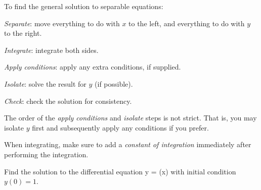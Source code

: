 \documentclass{book}
\begin{document}
To find the general solution to separable equations:
\begin{enumerate*}
\item \emph{Separate}: move everything to do with $x$ to the left, and
  everything to do with $y$ to the right.
\item \emph{Integrate}: integrate both sides.
\item \emph{Apply conditions}: apply any extra conditions, if
  supplied.
\item \emph{Isolate}: solve the result for $y$ (if possible).
\item \emph{Check}: check the solution for consistency.
\end{enumerate*}

The order of the \emph{apply conditions} and \emph{isolate} steps is
not strict.  That is, you may isolate $y$ first and subsequently apply
any conditions if you prefer.

\begin{heads}
  When integrating, make sure to add a \emph{constant of integration}
  immediately after performing the integration.
\end{heads}

\newpage
\begin{example}
  Find the solution to the differential equation
  \bel
    \label{eq:ex:separable}
    y  = \sin(x)
  \eel
  with initial condition $y(0) = 1$.
\end{example}
\end{document}
